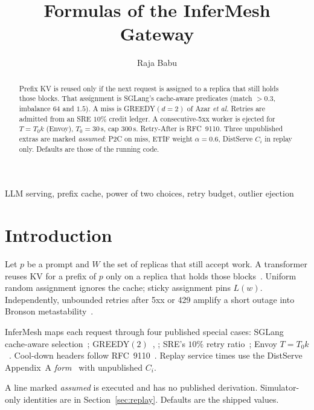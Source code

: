 \documentclass[journal,onecolumn]{IEEEtran}
\begin{document}
\title{Formulas of the InferMesh Gateway}

\author{Raja Babu}

\maketitle

\begin{abstract}
Prefix KV is reused only if the next request is assigned to a replica that
still holds those blocks. That assignment is SGLang's cache-aware
predicates (match $>0.3$, imbalance $64$ and $1.5$). A miss is
GREEDY$(d{=}2)$ of Azar \emph{et al.} Retries are admitted from an SRE
$10\%$ credit ledger. A consecutive-5xx worker is ejected for
$T=T_0 k$ (Envoy), $T_0=30\,\mathrm{s}$, cap $300\,\mathrm{s}$.
Retry-After is RFC~9110. Three unpublished extras are marked
\emph{assumed}: P2C on miss, ETIF weight $\alpha=0.6$, DistServe $C_i$ in
replay only. Defaults are those of the running code.
\end{abstract}

\begin{IEEEkeywords}
LLM serving, prefix cache, power of two choices, retry budget, outlier ejection
\end{IEEEkeywords}

\section{Introduction}

Let $p$ be a prompt and $W$ the set of replicas that still accept work.
A transformer reuses KV for a prefix of $p$ only on a replica that holds
those blocks~\cite{sglang}. Uniform random assignment ignores the cache;
sticky assignment pins $L(w)$. Independently, unbounded retries after 5xx
or 429 amplify a short outage into Bronson metastability~\cite{bronson2021}.

InferMesh maps each request through four published special cases: SGLang
cache-aware selection~\cite{sglang}; GREEDY$(2)$~\cite{azar1999},
\cite{mitzenmacher2001}; SRE's $10\%$ retry ratio~\cite{sre2016}; Envoy
$T=T_0 k$~\cite{envoy-outlier}. Cool-down headers follow
RFC~9110~\cite{rfc9110}. Replay service times use the DistServe
Appendix~A \emph{form}~\cite{zhong2024} with unpublished $C_i$.

A line marked \emph{assumed} is executed and has no published derivation.
Simulator-only identities are in Section~\ref{sec:replay}. Defaults are
the shipped values.
\end{document}
